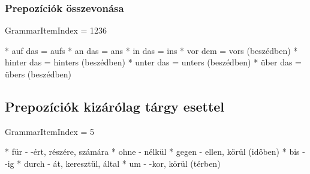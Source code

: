 \documentclass{article}
\newenvironment{desc}{\verbatim}{\endverbatim}
\newenvironment{exmp}{\verbatim}{\endverbatim}
\begin{document}
\subsubsection{Prepozíciók összevonása}

GrammarItemIndex = 1236

\begin{desc}
* auf das = aufs
* an das = ans
* in das = ins
* vor dem = vors (beszédben)
* hinter das = hinters (beszédben)
* unter das = unters (beszédben)
* über das = übers (beszédben)
\end{desc}

\begin{exmp}
\end{exmp}

\subsection{Prepozíciók kizárólag tárgy esettel}

GrammarItemIndex = 5

\begin{desc}
* für - -ért, részére, számára
* ohne - nélkül
* gegen - ellen, körül (időben)
* bis - -ig
* durch - át, keresztül, által
* um - -kor, körül (térben)
\end{desc}
\end{document}
